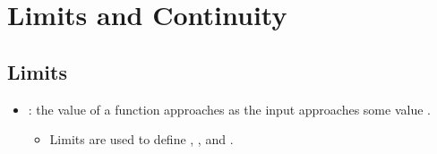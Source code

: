 \chapter{Limits and Continuity}

\section{Limits}


\smallskip

\begin{itemize}
  \item {}: the value of a function  approaches as the input  approaches some value . 
  \begin{itemize}
    \item Limits are used to define \hyperref[s: Continuity]{}, \hyperref[c: Derivatives]{}, and \hyperref[c: Integrals]{}.
  \end{itemize}


\end{itemize}
